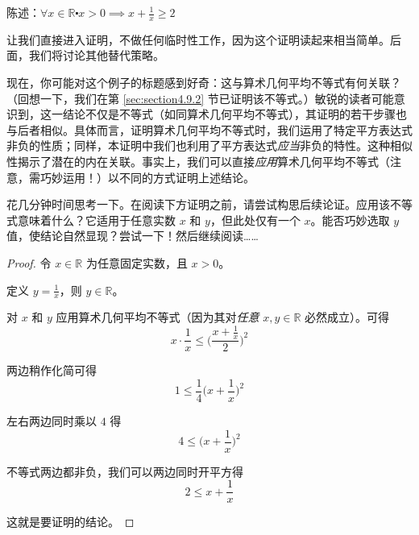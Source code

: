 \begin{example}[令人惊讶的算术几何平均不等式]
    \begin{center}
        陈述：$\forall x \in \mathbb{R} \centerdot x > 0 \implies x + \frac{1}{x} \ge 2$
    \end{center}

    让我们直接进入证明，不做任何临时性工作，因为这个证明读起来相当简单。后面，我们将讨论其他替代策略。

    \begin{center}
        \noindent {}
    \end{center}
\end{example}

现在，你可能对这个例子的标题感到好奇：这与算术几何平均不等式有何关联？（回想一下，我们在第 \ref{sec:section4.9.2} 节已证明该不等式。）敏锐的读者可能意识到，这一结论不仅是不等式（如同算术几何平均不等式），其证明的若干步骤也与后者相似。具体而言，证明算术几何平均不等式时，我们运用了特定平方表达式非负的性质；同样，本证明中我们也利用了平方表达式\emph{应当}非负的特性。这种相似性揭示了潜在的内在关联。事实上，我们可以直接\emph{应用}算术几何平均不等式（注意，需巧妙运用！）以不同的方式证明上述结论。

花几分钟时间思考一下。在阅读下方证明之前，请尝试构思后续论证。应用该不等式意味着什么？它适用于任意实数 $x$ 和 $y$，但此处仅有一个 $x$。能否巧妙选取 $y$ 值，使结论自然显现？尝试一下！然后继续阅读……

\begin{proof}
    令 $x \in \mathbb{R}$ 为任意固定实数，且 $x>0$。

    定义 $y = \frac{1}{x}$，则 $y \in \mathbb{R}$。

    对 $x$ 和 $y$ 应用算术几何平均不等式（因为其对\emph{任意} $x,y \in \mathbb{R}$ 必然成立）。可得
    \[x \cdot \frac{1}{x} \le \Big(\frac{x+\frac{1}{x}}{2}\Big)^2\]

    两边稍作化简可得
    \[1 \le \frac{1}{4}\Big(x+\frac{1}{x}\Big)^2\]

    左右两边同时乘以 $4$ 得
    \[4 \le \Big(x+\frac{1}{x}\Big)^2\]

    不等式两边都非负，我们可以两边同时开平方得
    \[2 \le x+\frac{1}{x}\]

    这就是要证明的结论。
\end{proof}

